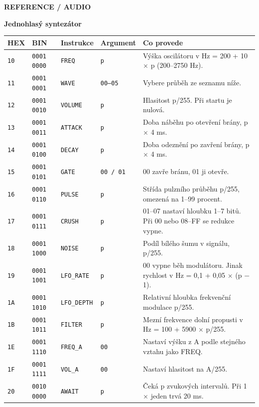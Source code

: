 \documentclass[11pt,a4paper]{article}
\newcommand{\tagline}[1]{{\sffamily\bfseries\color{accent}\small #1}\par}
\newcommand{\titleline}[1]{{\sffamily\bfseries\fontsize{25}{29}\selectfont #1\par}\vspace{2mm}}
\begin{document}
\clearpage
\tagline{REFERENCE  /  AUDIO}
\titleline{Jednohlasý syntezátor}
{\small\begin{tabularx}{\linewidth}{@{}llllX@{}}\toprule
\textbf{HEX} & \textbf{BIN} & \textbf{Instrukce} & \textbf{Argument} & \textbf{Co provede}\\\midrule
\texttt{10} & \texttt{0001 0000} & \texttt{FREQ} & \texttt{p} & Výška oscilátoru v Hz = 200 + 10 \ensuremath{\times} p (200--2750 Hz).\\
\texttt{11} & \texttt{0001 0001} & \texttt{WAVE} & \texttt{00--05} & Vybere průběh ze seznamu níže.\\
\texttt{12} & \texttt{0001 0010} & \texttt{VOLUME} & \texttt{p} & Hlasitost p/255. Při startu je nulová.\\
\texttt{13} & \texttt{0001 0011} & \texttt{ATTACK} & \texttt{p} & Doba náběhu po otevření brány, p \ensuremath{\times} 4 ms.\\
\texttt{14} & \texttt{0001 0100} & \texttt{DECAY} & \texttt{p} & Doba odeznění po zavření brány, p \ensuremath{\times} 4 ms.\\
\texttt{15} & \texttt{0001 0101} & \texttt{GATE} & \texttt{00 / 01} & 00 zavře bránu, 01 ji otevře.\\
\texttt{16} & \texttt{0001 0110} & \texttt{PULSE} & \texttt{p} & Střída pulzního průběhu p/255, omezená na 1--99 procent.\\
\texttt{17} & \texttt{0001 0111} & \texttt{CRUSH} & \texttt{p} & 01--07 nastaví hloubku 1--7 bitů. Při 00 nebo 08--FF se redukce vypne.\\
\texttt{18} & \texttt{0001 1000} & \texttt{NOISE} & \texttt{p} & Podíl bílého šumu v signálu, p/255.\\
\texttt{19} & \texttt{0001 1001} & \texttt{LFO\_RATE} & \texttt{p} & 00 vypne běh modulátoru. Jinak rychlost v Hz = 0,1 + 0,05 \ensuremath{\times} (p \ensuremath{-} 1).\\
\texttt{1A} & \texttt{0001 1010} & \texttt{LFO\_DEPTH} & \texttt{p} & Relativní hloubka frekvenční modulace p/255.\\
\texttt{1B} & \texttt{0001 1011} & \texttt{FILTER} & \texttt{p} & Mezní frekvence dolní propusti v Hz = 100 + 5900 \ensuremath{\times} p/255.\\
\texttt{1E} & \texttt{0001 1110} & \texttt{FREQ\_A} & \texttt{00} & Nastaví výšku z A podle stejného vztahu jako FREQ.\\
\texttt{1F} & \texttt{0001 1111} & \texttt{VOL\_A} & \texttt{00} & Nastaví hlasitost na A/255.\\
\texttt{20} & \texttt{0010 0000} & \texttt{AWAIT} & \texttt{p} & Čeká p zvukových intervalů. Při 1\ensuremath{\times} jeden trvá 20 ms.\\
\bottomrule\end{tabularx}}\par
\end{document}
